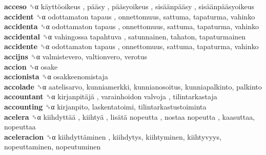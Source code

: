 \textbf{acceso} ␝α   käyttöoikeus ,  pääsy ,  pääsyoikeus ,  sisäänpääsy ,  sisäänpääsyoikeus   \\
\textbf{accident} ␝α   odottamaton tapaus , onnettomuus, sattuma, tapaturma, vahinko  \\
\textbf{accidenta} ␝α   odottamaton tapaus , onnettomuus, sattuma, tapaturma, vahinko  \\
\textbf{accidental} ␝α   vahingossa tapahtuva , satunnainen, tahaton, tapaturmainen  \\
\textbf{accidente} ␝α   odottamaton tapaus , onnettomuus, sattuma, tapaturma, vahinko  \\
\textbf{accijns} ␝α  valmistevero, valtionvero, verotus  \\
\textbf{accion} ␝α  osake  \\
\textbf{accionista} ␝α  osakkeenomistaja  \\
\textbf{accolade} ␝α  aatelisarvo, kunniamerkki, kunnianosoitus, kunniapalkinto, palkinto  \\
\textbf{accountant} ␝α   kirjanpitäjä ,  varainhoidon valvoja , tilintarkastaja  \\
\textbf{accounting} ␝α  kirjanpito, laskentatoimi, tilintarkastustoiminta  \\
\textbf{acelera} ␝α   kiihdyttää ,  kiihtyä ,  lisätä nopeutta ,  nostaa nopeutta , kaasuttaa, nopeuttaa  \\
\textbf{aceleracion} ␝α   kiihdyttäminen , kiihdytys, kiihtyminen, kiihtyvyys, nopeuttaminen, nopeutuminen  \\

